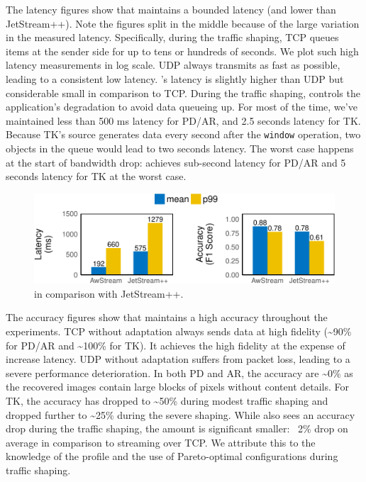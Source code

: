 The latency figures show that \sysname{} maintains a bounded latency (and lower
than JetStream++). Note the figures split in the middle because of the large
variation in the measured latency. Specifically, during the traffic shaping, TCP
queues items at the sender side for up to tens or hundreds of seconds. We plot
such high latency measurements in log scale. UDP always transmits as fast as
possible, leading to a consistent low latency. \sysname{}'s latency is slightly
higher than UDP but considerable small in comparison to TCP\@. During the
traffic shaping, \sysname{} controls the application's degradation to avoid data
queueing up. For most of the time, we've maintained less than 500 ms latency for
PD/AR, and 2.5 seconds latency for TK\@. Because TK's source generates data
every second after the \texttt{window} operation, two objects in the queue would
lead to two seconds latency. The worst case happens at the start of bandwidth
drop: \sysname{} achieves sub-second latency for PD/AR and 5 seconds latency for
TK at the worst case.

\begin{figure}
  \centering
  \includegraphics[width=0.95\columnwidth]{figures/darknet-runtime-bar.pdf}
  \caption{\sysname{} in comparison with JetStream++.}
  \label{fig:darknet-runtime-bar}
\end{figure}

The accuracy figures show that \sysname{} maintains a high accuracy throughout
the experiments. TCP without adaptation always sends data at high fidelity
(\textasciitilde 90\% for PD/AR and \textasciitilde 100\% for TK). It achieves
the high fidelity at the expense of increase latency. UDP without adaptation
suffers from packet loss, leading to a severe performance deterioration.  In
both PD and AR, the accuracy are \textasciitilde 0\% as the recovered images
contain large blocks of pixels without content details. For TK, the accuracy has
dropped to \textasciitilde 50\% during modest traffic shaping and dropped
further to \textasciitilde 25\% during the severe shaping. While \sysname{} also
sees an accuracy drop during the traffic shaping, the amount is significant
smaller: ~2\% drop on average in comparison to streaming over TCP\@.  We
attribute this to the knowledge of the profile and the use of Pareto-optimal
configurations during traffic shaping.

